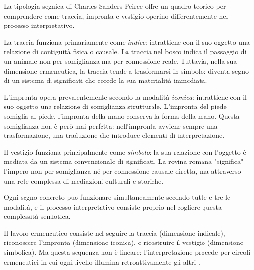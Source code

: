 La tipologia segnica di Charles Sanders Peirce \cite{peirce1931} offre un quadro teorico per comprendere come traccia, impronta e vestigio operino differentemente nel processo interpretativo.

La traccia funziona primariamente come \textit{indice}: intrattiene con il suo oggetto una relazione di contiguità fisica o causale. La traccia nel bosco indica il passaggio di un animale non per somiglianza ma per connessione reale. Tuttavia, nella sua dimensione ermeneutica, la traccia tende a trasformarsi in simbolo: diventa segno di un sistema di significati che eccede la sua materialità immediata.

L'impronta opera prevalentemente secondo la modalità \textit{iconica}: intrattiene con il suo oggetto una relazione di somiglianza strutturale. L'impronta del piede somiglia al piede, l'impronta della mano conserva la forma della mano. Questa somiglianza non è però mai perfetta: nell'impronta avviene sempre una trasformazione, una traduzione che introduce elementi di interpretazione.

Il vestigio funziona principalmente come \textit{simbolo}: la sua relazione con l'oggetto è mediata da un sistema convenzionale di significati. La rovina romana "significa" l'impero non per somiglianza né per connessione causale diretta, ma attraverso una rete complessa di mediazioni culturali e storiche.


Ogni segno concreto può funzionare simultaneamente secondo tutte e tre le modalità, e il processo interpretativo consiste proprio nel cogliere questa complessità semiotica.

Il lavoro ermeneutico consiste nel seguire la traccia (dimensione indicale), riconoscere l'impronta (dimensione iconica), e ricostruire il vestigio (dimensione simbolica). Ma questa sequenza non è lineare: l'interpretazione procede per circoli ermeneutici in cui ogni livello illumina retroattivamente gli altri \cite{gadamer1960}.

%

